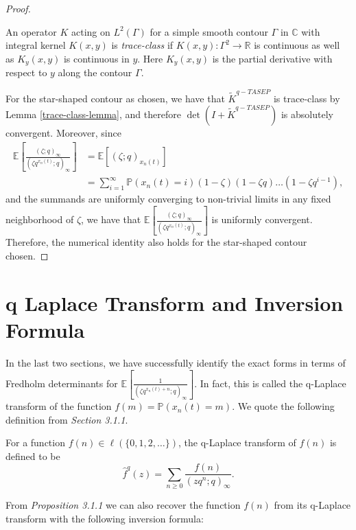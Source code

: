 \begin{proof}
\begin{lemma}
\label{trace-class-lemma}
An operator $K$ acting on $L^2(\Gamma)$ for a simple smooth contour $\Gamma$ in $\mathbb{C}$ with integral kernel $K(x,y)$ is \emph{trace-class} if $K(x,y): \Gamma^2 \rightarrow \mathbb{R}$ is continuous as well as $K_y(x,y)$ is continuous in $y$. Here $K_y(x,y)$ is the partial derivative with respect to $y$ along the contour $\Gamma$.
\end{lemma}
For the star-shaped contour as chosen, we have that $\tilde{K}^{q-TASEP}$ is trace-class by Lemma \ref{trace-class-lemma}, and therefore $\det(I+\tilde{K}^{q-TASEP})$ is absolutely convergent. Moreover, since 
\begin{align*}
\mathbb{E} \left[ \frac{(\zeta;q)_{\infty}}{(\zeta q^{x_n(t)}; q)_{\infty}} \right] &= \mathbb{E} \left[ (\zeta; q)_{x_n(t)} \right] \\
&= \sum_{i=1}^{\infty} \mathbb{P}(x_n(t) = i) (1-\zeta) (1-\zeta q) \dots (1-\zeta q^{i-1}),
\end{align*}
and the summands are uniformly converging to non-trivial limits in any fixed neighborhood of $\zeta$, we have that $\mathbb{E} \left[ \frac{(\zeta;q)_{\infty}}{(\zeta q^{x_n(t)}; q)_{\infty}} \right]$ is uniformly convergent. Therefore, the numerical identity also holds for the star-shaped contour chosen.
\end{proof}

\section{q Laplace Transform and Inversion Formula}
In the last two sections, we have successfully identify the exact forms in terms of Fredholm determinants for $\mathbb{E}\left[ \frac{1}{(\zeta q^{x_n(t) + n}; q)_{\infty}} \right]$. In fact, this is called the q-Laplace transform of the function $f(m) = \mathbb{P}(x_n(t) = m)$. We quote the following definition from \cite{macdonald2014} \textit{Section 3.1.1}.

\begin{definition}
For a function $f(n) \in \ell(\{0,1,2,\dots \})$, the q-Laplace transform of $f(n)$ is defined to be $$\hat{f}^q(z) = \sum_{n \ge 0} \frac{f(n)}{(zq^n;q)_{\infty}}.$$
\end{definition}

From \cite{macdonald2014} \textit{ Proposition 3.1.1 } we can also recover the function $f(n)$ from its q-Laplace transform with the following inversion formula:

